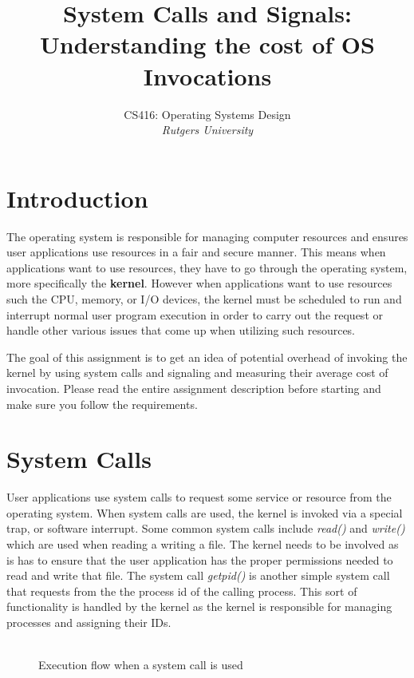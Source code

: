\documentclass{article}
\title{\textbf{System Calls and Signals:}\\ Understanding the cost of OS Invocations} %
\author{CS416: Operating Systems Design \\ \textit{Rutgers University}} %
\date{} %
\begin{document}
\maketitle %


\section*{Introduction}
The operating system is responsible for managing computer resources and ensures user applications use resources in a fair and secure manner. This means when applications want to use resources, they have to go through the operating system, more specifically the \textbf{kernel}. However when applications want to use resources such the CPU, memory, or I/O devices, the kernel must be scheduled to run and interrupt normal user program execution in order to carry out the request or handle other various issues that come up when utilizing such resources. 

The goal of this assignment is to get an idea of potential overhead of invoking the kernel by using system calls and signaling and measuring their average cost of invocation. Please read the entire assignment description before starting and make sure you follow the requirements.

\section{System Calls}
User applications use system calls to request some service or resource from the operating system. When system calls are used, the kernel is invoked via a special trap, or software interrupt.  Some common system calls include \textit{read()} and \textit{write()} which are used when reading a writing a file. The kernel needs to be involved as is has to ensure that the user application has the proper permissions needed to read and write that file. The system call \textit{getpid()} is another simple system call that requests from the the process id of the calling process. This sort of functionality is handled by the kernel as the kernel is responsible for managing processes and assigning their IDs.  \\\\

 \begin{figure}[!htb]
        \captionsetup{justification=centering}
        \caption{Execution flow when a system call is used}
\end{figure}
\end{document}
